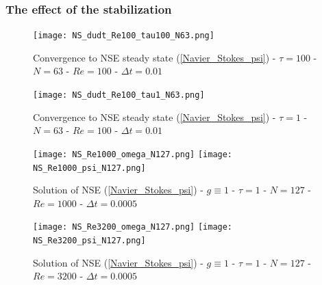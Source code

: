 \documentclass[hyperref={pdfpagemode=FullScreen},9pt]{beamer}
\begin{document}
%
\begin{frame}
\frametitle{The effect of the stabilization}
\begin{figure}[!h]
\begin{center}
\texttt{[image: NS\_dudt\_Re100\_tau100\_N63.png]}
\vskip -0.5cm
\caption{Convergence to NSE steady state (\ref{Navier_Stokes_psi}) - $\tau = 100$ -  $N=63$ - $Re = 100$ - $\Delta t = 0.01$}
\label{NS_dudt_Re100_tau100_N63}
\end{center}
\end{figure}
\end{frame}
%
\begin{frame}
\begin{figure}[!h]
\begin{center}
\texttt{[image: NS\_dudt\_Re100\_tau1\_N63.png]}
\vskip -0.5cm
\caption{Convergence to NSE steady state (\ref{Navier_Stokes_psi}) - $\tau = 1$ -  $N=63$ - $Re = 100$ - $\Delta t = 0.01$}
\label{NS_dudt_Re100_tau1_N63}
\end{center}
\end{figure}
\end{frame}
%
\begin{frame}
\begin{figure}[!h]
\begin{center}
\texttt{[image: NS\_Re1000\_omega\_N127.png]}
\texttt{[image: NS\_Re1000\_psi\_N127.png]}\\
\caption{Solution of NSE (\ref{Navier_Stokes_psi}) - $g \equiv 1$ - $\tau = 1$ -  $N=127$ - $Re = 1000$ - $\Delta t = 0.0005$}
\label{NS_Re1000}
\end{center}
\end{figure}
\end{frame}
%
\begin{frame}
\begin{figure}[!h]
\begin{center}
\texttt{[image: NS\_Re3200\_omega\_N127.png]}
\texttt{[image: NS\_Re3200\_psi\_N127.png]}\\
\caption{Solution of NSE (\ref{Navier_Stokes_psi}) - $g \equiv 1$ - $\tau = 1$ -  $N=127$ - $Re = 3200$ - $\Delta t = 0.0005$}
\label{NS_Re3200}
\end{center}
\end{figure}

\end{frame}
\end{document}

